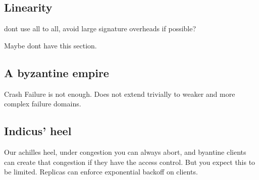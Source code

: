 \subsection{Linearity}
dont use all to all, avoid large signature overheads if possible?

Maybe dont have this section. 

\subsection{A byzantine empire}
Crash Failure is not enough. Does not extend trivially to weaker and more complex failure domains.

\subsection{Indicus' heel}
Our achilles heel, under congestion you can always abort, and byantine clients can create that congestion if they have the access control. But you expect this to be limited. 
Replicas can enforce exponential backoff on clients.